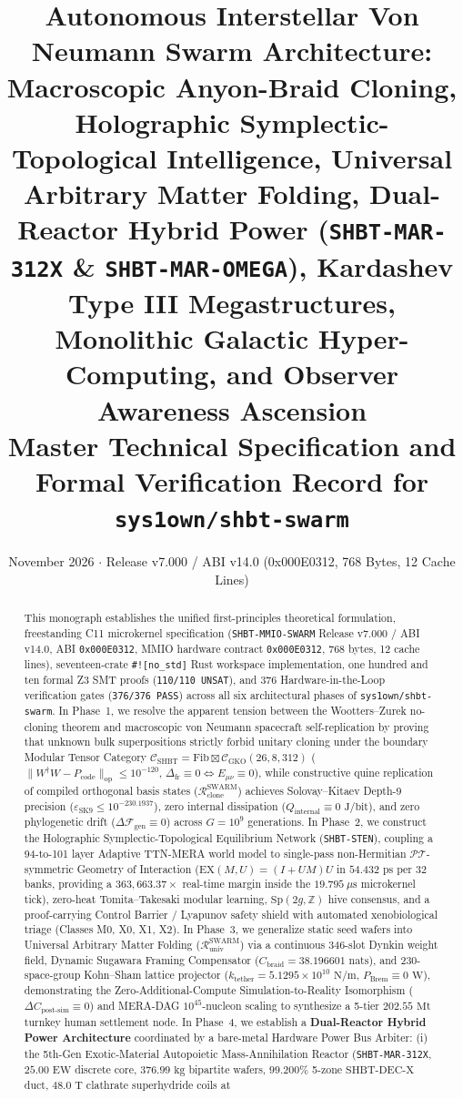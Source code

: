 \documentclass[11pt,onecolumn]{article}
\title{\textbf{Autonomous Interstellar Von Neumann Swarm Architecture: Macroscopic Anyon-Braid Cloning, Holographic Symplectic-Topological Intelligence, Universal Arbitrary Matter Folding, Dual-Reactor Hybrid Power (\texttt{SHBT-MAR-312X} \& \texttt{SHBT-MAR-OMEGA}), Kardashev Type III Megastructures, Monolithic Galactic Hyper-Computing, and Observer Awareness Ascension}\\[0.3em]\large Master Technical Specification and Formal Verification Record for \texttt{sys1own/shbt-swarm}}
\author{}
\date{November 2026 \quad $\cdot$ \quad Release v7.000 / ABI v14.0 (0x000E0312, 768 Bytes, 12 Cache Lines)}
\begin{document}
\maketitle

\begin{abstract}
This monograph establishes the unified first-principles theoretical formulation, freestanding C11 microkernel specification (\texttt{SHBT-MMIO-SWARM} Release v7.000 / ABI v14.0, ABI \texttt{0x000E0312}, MMIO hardware contract \texttt{0x000E0312}, 768 bytes, 12 cache lines), seventeen-crate \texttt{\#![no\_std]} Rust workspace implementation, one hundred and ten formal Z3 SMT proofs (\texttt{110/110 UNSAT}), and 376 Hardware-in-the-Loop verification gates (\texttt{376/376 PASS}) across all six architectural phases of \texttt{sys1own/shbt-swarm}. In Phase~1, we resolve the apparent tension between the Wootters--Zurek no-cloning theorem and macroscopic von Neumann spacecraft self-replication by proving that unknown bulk superpositions strictly forbid unitary cloning under the boundary Modular Tensor Category $\mathcal{C}_{\text{SHBT}} = \text{Fib} \boxtimes \mathcal{C}_{\text{GKO}}(26, 8, 312)$ ($\|W^\dagger W - P_{\text{code}}\|_{\text{op}} \le 10^{-120}$, $\Delta_{\text{fr}} \equiv 0 \iff E_{\mu\nu} \equiv 0$), while constructive quine replication of compiled orthogonal basis states ($\mathcal{R}_{\text{clone}}^{\text{SWARM}}$) achieves Solovay--Kitaev Depth-9 precision ($\varepsilon_{\text{SK9}} \le 10^{-230.1937}$), zero internal dissipation ($Q_{\text{internal}} \equiv 0\text{ J/bit}$), and zero phylogenetic drift ($\Delta\mathcal{F}_{\text{gen}} \equiv 0$) across $G = 10^9$ generations. In Phase~2, we construct the Holographic Symplectic-Topological Equilibrium Network (\texttt{SHBT-STEN}), coupling a 94-to-101 layer Adaptive TTN-MERA world model to single-pass non-Hermitian $\mathcal{PT}$-symmetric Geometry of Interaction ($\text{EX}(M,U) = (I+UM)U$ in $54.432\text{ ps}$ per 32 banks, providing a $363{,}663.37\times$ real-time margin inside the $19.795\ \mu\text{s}$ microkernel tick), zero-heat Tomita--Takesaki modular learning, $\text{Sp}(2g,\mathbb{Z})$ hive consensus, and a proof-carrying Control Barrier / Lyapunov safety shield with automated xenobiological triage (Classes M0, X0, X1, X2). In Phase~3, we generalize static seed wafers into Universal Arbitrary Matter Folding ($\mathcal{R}_{\text{univ}}^{\text{SWARM}}$) via a continuous 346-slot Dynkin weight field, Dynamic Sugawara Framing Compensator ($C_{\text{braid}} = 38.196601\text{ nats}$), and 230-space-group Kohn--Sham lattice projector ($k_{\text{tether}} = 5.1295 \times 10^{10}\text{ N/m}$, $P_{\text{Brem}} \equiv 0\text{ W}$), demonstrating the Zero-Additional-Compute Simulation-to-Reality Isomorphism ($\Delta C_{\text{post-sim}} \equiv 0$) and MERA-DAG $10^{45}$-nucleon scaling to synthesize a 5-tier $202.55\text{ Mt}$ turnkey human settlement node. In Phase~4, we establish a \textbf{Dual-Reactor Hybrid Power Architecture} coordinated by a bare-metal Hardware Power Bus Arbiter: (i) the 5th-Gen Exotic-Material Autopoietic Mass-Annihilation Reactor (\texttt{SHBT-MAR-312X}, $25.00\text{ EW}$ discrete core, $376.99\text{ kg}$ bipartite wafers, $99.200\%$ 5-zone $\text{SHBT-DEC-X}$ duct, $48.0\text{ T}$ clathrate superhydride coils at 
\end{abstract}
\end{document}
